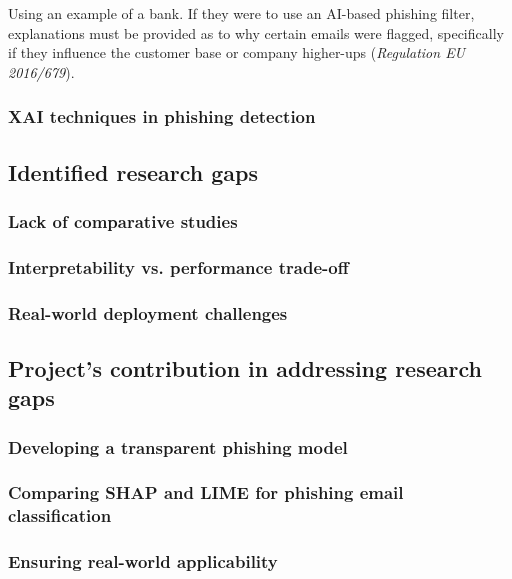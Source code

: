 \noindent Using an example of a bank. If they were to use an AI-based phishing filter, explanations must be provided as to why certain emails were flagged, specifically if they influence the customer base or company higher-ups (\textit{Regulation EU 2016/679}).

\subsubsection*{XAI techniques in phishing detection}

\newpage

\subsection*{Identified research gaps}

\subsubsection*{Lack of comparative studies}

\subsubsection*{Interpretability vs. performance trade-off}

\subsubsection*{Real-world deployment challenges}

\newpage

\subsection*{Project's contribution in addressing research gaps}

\subsubsection*{Developing a transparent phishing model}

\subsubsection*{Comparing SHAP and LIME for phishing email classification}

\subsubsection*{Ensuring real-world applicability}
